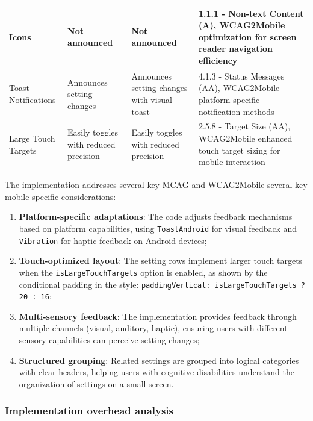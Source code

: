 \begin{longtable}[c]{|C{2.8cm}|C{3.5cm}|C{3.5cm}|C{4.6cm}|}
\hline
Icons &  Not announced &  Not announced & 1.1.1 - Non-text Content (A), WCAG2Mobile optimization for screen reader navigation efficiency \\
\hline
Toast Notifications &  Announces setting changes &  Announces setting changes with visual toast & 4.1.3 - Status Messages (AA), WCAG2Mobile platform-specific notification methods \\
\hline
Large Touch Targets &  Easily toggles with reduced precision &  Easily toggles with reduced precision & 2.5.8 - Target Size (AA), WCAG2Mobile enhanced touch target sizing for mobile interaction \\
\end{longtable}

\FloatBarrier

The implementation addresses several key MCAG and WCAG2Mobile several key mobile-specific considerations:

\begin{enumerate}
    \item \textbf{Platform-specific adaptations}: The code adjusts feedback mechanisms based on platform capabilities, using \texttt{ToastAndroid} for visual feedback and \texttt{Vibration} for haptic feedback on Android devices;
    
    \item \textbf{Touch-optimized layout}: The setting rows implement larger touch targets when the \texttt{isLargeTouchTargets} option is enabled, as shown by the conditional padding in the style: \texttt{paddingVertical: isLargeTouchTargets ? 20 : 16};
    
    \item \textbf{Multi-sensory feedback}: The implementation provides feedback through multiple channels (visual, auditory, haptic), ensuring users with different sensory capabilities can perceive setting changes;
    
    \item \textbf{Structured grouping}: Related settings are grouped into logical categories with clear headers, helping users with cognitive disabilities understand the organization of settings on a small screen.
\end{enumerate}

\subsubsection{Implementation overhead analysis}

